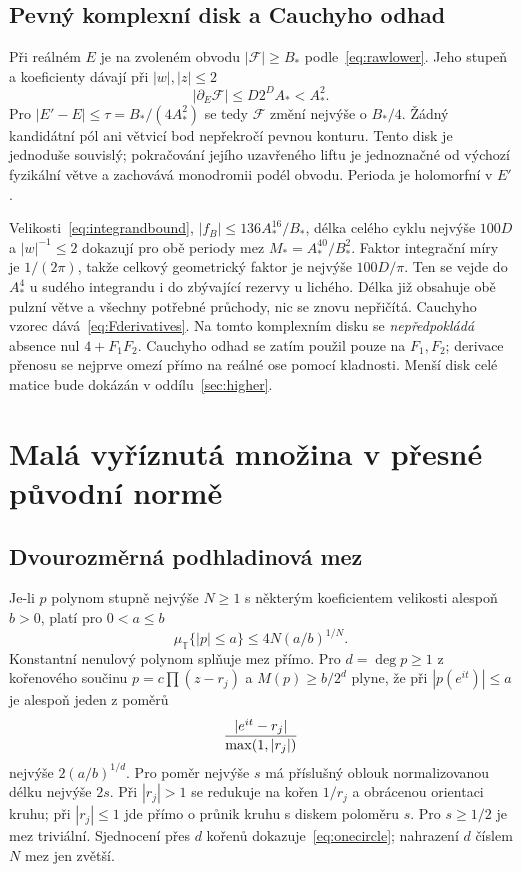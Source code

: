 \documentclass[11pt,a4paper]{article}
\theoremstyle{remark}\newtheorem{remark}[theorem]{Poznámka}
\numberwithin{equation}{section}
\begin{document}
\subsection{Pevný komplexní disk a Cauchyho odhad}

Při reálném \(E\) je na zvoleném obvodu \(|\mathscr F|\ge B_*\) podle~\eqref{eq:rawlower}. Jeho stupeň a koeficienty dávají při \(|w|,|z|\le2\)
\[
|\partial_E\mathscr F|\le D2^DA_*<A_*^2.
\]
Pro \(|E'-E|\le\tau=B_*/(4A_*^2)\) se tedy \(\mathscr F\) změní nejvýše o \(B_*/4\). Žádný kandidátní pól ani větvicí bod nepřekročí pevnou konturu. Tento disk je jednoduše souvislý; pokračování jejího uzavřeného liftu je jednoznačné od výchozí fyzikální větve a zachovává monodromii podél obvodu. Perioda je holomorfní v \(E'\).

Velikosti~\eqref{eq:integrandbound}, \(|f_B|\le136A_*^{16}/B_*\), délka celého cyklu nejvýše \(100D\) a \(|w|^{-1}\le2\) dokazují pro obě periody mez \(M_*=A_*^{40}/B_*^2\). Faktor integrační míry je \(1/(2\pi)\), takže celkový geometrický faktor je nejvýše \(100D/\pi\). Ten se vejde do \(A_*^4\) u sudého integrandu i do zbývající rezervy u lichého. Délka již obsahuje obě pulzní větve a všechny potřebné průchody, nic se znovu nepřičítá. Cauchyho vzorec dává~\eqref{eq:Fderivatives}. Na tomto komplexním disku se \emph{nepředpokládá} absence nul \(4+F_1F_2\). Cauchyho odhad se zatím použil pouze na \(F_1,F_2\); derivace přenosu se nejprve omezí přímo na reálné ose pomocí kladnosti. Menší disk celé matice bude dokázán v oddílu~\ref{sec:higher}.

\section{Malá vyříznutá množina v přesné původní normě}
\label{sec:cutoff}

\subsection{Dvourozměrná podhladinová mez}

Je-li \(p\) polynom stupně nejvýše \(N\ge1\) s některým koeficientem velikosti alespoň \(b>0\), platí pro \(0<a\le b\)
\begin{equation}
\mu_{\mathbb T}\{|p|\le a\}\le4N(a/b)^{1/N}.
\label{eq:onecircle}
\end{equation}
Konstantní nenulový polynom splňuje mez přímo. Pro \(d=\deg p\ge1\) z kořenového součinu \(p=c\prod(z-r_j)\) a \(M(p)\ge b/2^d\) plyne, že při \(|p(e^{it})|\le a\) je alespoň jeden z poměrů
\[
{|e^{it}-r_j|\over\max(1,|r_j|)}
\]
nejvýše \(2(a/b)^{1/d}\). Pro poměr nejvýše \(s\) má příslušný oblouk normalizovanou délku nejvýše \(2s\). Při \(|r_j|>1\) se redukuje na kořen \(1/r_j\) a obrácenou orientaci kruhu; při \(|r_j|\le1\) jde přímo o průnik kruhu s diskem poloměru \(s\). Pro \(s\ge1/2\) je mez triviální. Sjednocení přes \(d\) kořenů dokazuje~\eqref{eq:onecircle}; nahrazení \(d\) číslem \(N\) mez jen zvětší.
\end{document}
